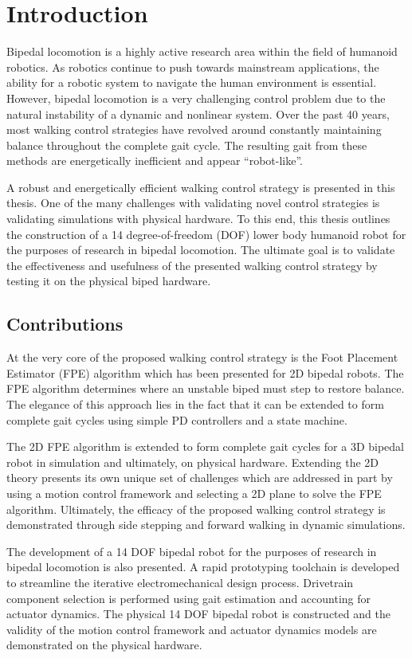 \chapter{Introduction} %
\label{cha:introduction}
Bipedal locomotion is a highly active research area within the field of humanoid robotics. As robotics continue to push towards mainstream applications, the ability for a robotic system to navigate the human environment is essential. However, bipedal locomotion is a very challenging control problem due to the natural instability of a dynamic and nonlinear system. Over the past 40 years, most walking control strategies have revolved around constantly maintaining balance throughout the complete gait cycle. The resulting gait from these methods are energetically inefficient and appear ``robot-like''. 

A robust and energetically efficient walking control strategy is presented in this thesis. One of the many challenges with validating novel control strategies is validating simulations with physical hardware. To this end, this thesis outlines the construction of a 14 degree-of-freedom (DOF) lower body humanoid robot for the purposes of research in bipedal locomotion. The ultimate goal is to validate the effectiveness and usefulness of the presented walking control strategy by testing it on the physical biped hardware. 

\section{Contributions} %
\label{sec:contributions}
At the very core of the proposed walking control strategy is the Foot Placement Estimator (FPE) algorithm which has been presented for 2D bipedal robots. The FPE algorithm determines where an unstable biped must step to restore balance. The elegance of this approach lies in the fact that it can be extended to form complete gait cycles using simple PD controllers and a state machine. 

The 2D FPE algorithm is extended to form complete gait cycles for a 3D bipedal robot in simulation and ultimately, on physical hardware. Extending the 2D theory presents its own unique set of challenges which are addressed in part by using a motion control framework and selecting a 2D plane to solve the FPE algorithm. Ultimately, the efficacy of the proposed walking control strategy is demonstrated through side stepping and forward walking in dynamic simulations. 

The development of a 14 DOF bipedal robot for the purposes of research in bipedal locomotion is also presented. A rapid prototyping toolchain is developed to streamline the iterative electromechanical design process. Drivetrain component selection is performed using gait estimation and accounting for actuator dynamics. The physical 14 DOF bipedal robot is constructed and the validity of the motion control framework and actuator dynamics models are demonstrated on the physical hardware. 

